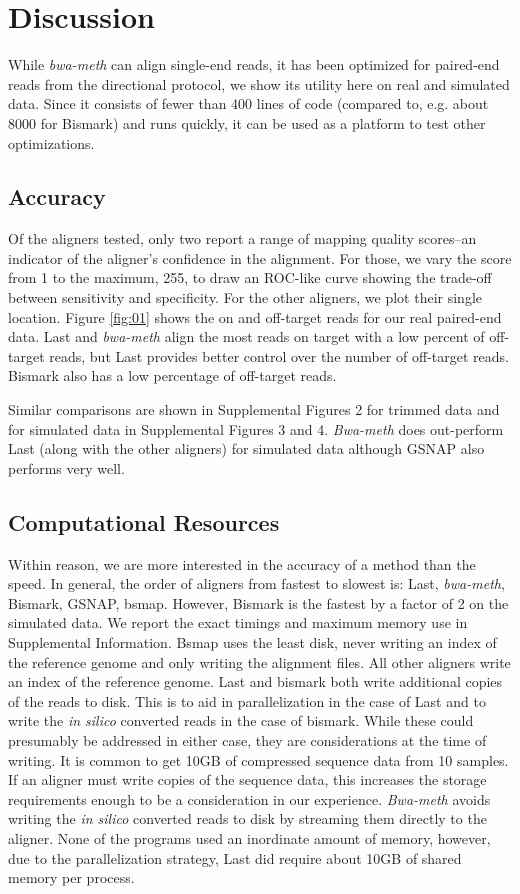 \documentclass{bioinfo}
\begin{document}
\section{Discussion}

While \textit{bwa-meth} can align single-end reads, it has been optimized for
paired-end reads from the directional protocol, we show its utility here on real
and simulated data. Since it consists
of fewer than 400 lines of code (compared to, e.g. about 8000 for Bismark) and runs
quickly, it can be used as a platform to test other optimizations.

\subsection{Accuracy}
Of the aligners tested, only two report a range of mapping quality
scores--an indicator of the aligner's confidence in the alignment. For
those, we vary the score from 1 to the maximum, 255, to draw an ROC-like
curve showing the trade-off between sensitivity and specificity. For the
other aligners, we plot their single location. Figure \ref{fig:01} shows
the on and off-target reads for our real paired-end data. Last and 
\textit{bwa-meth} align the most reads on target with a low percent
of off-target reads, but Last provides better control over the number
of off-target reads. Bismark also has a low percentage of off-target reads.

Similar comparisons are shown in  Supplemental Figures 2
for trimmed data and for simulated data in Supplemental Figures 3 and 4.
\textit{Bwa-meth} does out-perform Last (along with the other aligners)
for simulated data although GSNAP also performs very well.

\subsection{Computational Resources}
Within reason, we are more interested in the accuracy of a
method than the speed. In general, the order of aligners from fastest to
slowest is: Last, \textit{bwa-meth}, Bismark, GSNAP, bsmap. However, Bismark
is the fastest by a factor of 2 on the simulated data. We report the exact 
timings and maximum memory use in Supplemental Information.
Bsmap uses the least disk, never writing an index of the reference genome
and only writing the alignment files. All other aligners write an index of
the reference genome. Last and bismark both write additional copies of the
reads to disk. This is to aid in parallelization in the case of Last and to
write the \emph{in silico} converted reads in the case of bismark. While
these could presumably be addressed in either case, they are considerations
at the time of writing. It is common to get 10GB of compressed sequence data
from 10 samples. If an aligner must write copies of the
sequence data, this increases the storage requirements enough to be a
consideration in our experience. \textit{Bwa-meth} avoids writing the \emph{in silico}
converted reads to disk by streaming them directly to the aligner.
None of the programs used an inordinate amount of memory, however, due to
the parallelization strategy, Last did require about 10GB of shared memory
per process.
\end{document}
